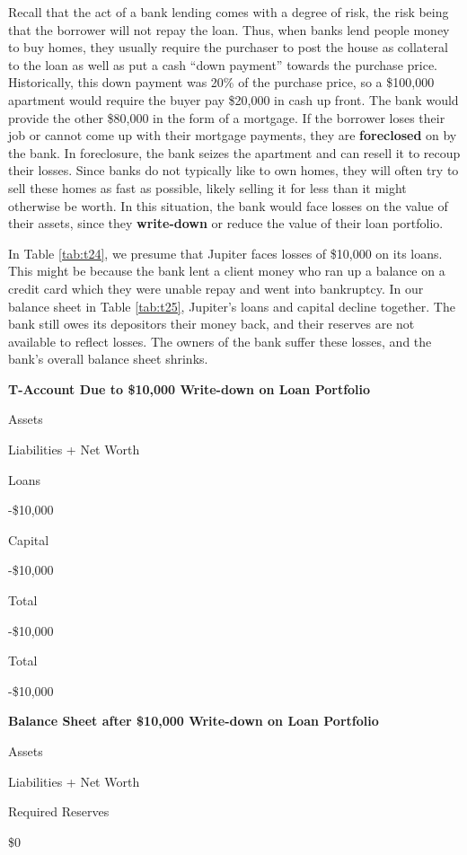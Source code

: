 \documentclass[
]{book}
\begin{document}
Recall that the act of a bank lending comes with a degree of risk, the risk being that the borrower will not repay the loan. Thus, when banks lend people money to buy homes, they usually require the purchaser to post the house as collateral to the loan as well as put a cash ``down payment'' towards the purchase price. Historically, this down payment was 20\% of the purchase price, so a \$100,000 apartment would require the buyer pay \$20,000 in cash up front. The bank would provide the other \$80,000 in the form of a mortgage. If the borrower loses their job or cannot come up with their mortgage payments, they are \textbf{foreclosed} on by the bank. In foreclosure, the bank seizes the apartment and can resell it to recoup their losses. Since banks do not typically like to own homes, they will often try to sell these homes as fast as possible, likely selling it for less than it might otherwise be worth. In this situation, the bank would face losses on the value of their assets, since they \textbf{write-down} or reduce the value of their loan portfolio.

In Table \ref{tab:t24}, we presume that Jupiter faces losses of \$10,000 on its loans. This might be because the bank lent a client money who ran up a balance on a credit card which they were unable repay and went into bankruptcy. In our balance sheet in Table \ref{tab:t25}, Jupiter's loans and capital decline together. The bank still owes its depositors their money back, and their reserves are not available to reflect losses. The owners of the bank suffer these losses, and the bank's overall balance sheet shrinks.

\label{tab:t24}\textbf{T-Account Due to \$10,000 Write-down on Loan Portfolio}

Assets

Liabilities + Net Worth

Loans

-\$10,000

Capital

-\$10,000

Total

-\$10,000

Total

-\$10,000

\label{tab:t25}\textbf{Balance Sheet after \$10,000 Write-down on Loan Portfolio}

Assets

Liabilities + Net Worth

Required Reserves

\$0
\end{document}
